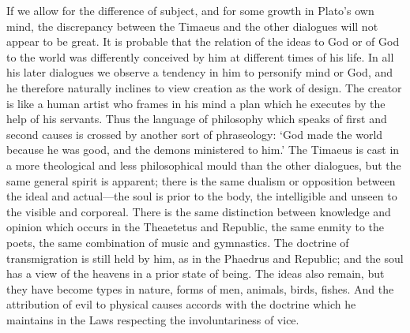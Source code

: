 \documentclass[11pt,letter]{article}
\begin{document}
\par  If we allow for the difference of subject, and for some growth in Plato’s own mind, the discrepancy between the Timaeus and the other dialogues will not appear to be great. It is probable that the relation of the ideas to God or of God to the world was differently conceived by him at different times of his life. In all his later dialogues we observe a tendency in him to personify mind or God, and he therefore naturally inclines to view creation as the work of design. The creator is like a human artist who frames in his mind a plan which he executes by the help of his servants. Thus the language of philosophy which speaks of first and second causes is crossed by another sort of phraseology: ‘God made the world because he was good, and the demons ministered to him.’ The Timaeus is cast in a more theological and less philosophical mould than the other dialogues, but the same general spirit is apparent; there is the same dualism or opposition between the ideal and actual—the soul is prior to the body, the intelligible and unseen to the visible and corporeal. There is the same distinction between knowledge and opinion which occurs in the Theaetetus and Republic, the same enmity to the poets, the same combination of music and gymnastics. The doctrine of transmigration is still held by him, as in the Phaedrus and Republic; and the soul has a view of the heavens in a prior state of being. The ideas also remain, but they have become types in nature, forms of men, animals, birds, fishes. And the attribution of evil to physical causes accords with the doctrine which he maintains in the Laws respecting the involuntariness of vice.
\end{document}
